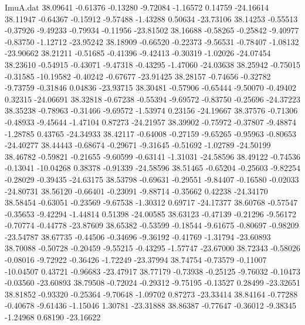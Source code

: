 \begin{filecontents}{ImuA.dat}
  38.09641   -0.61376   -0.13280   -9.72084   -1.16572    0.14759  -24.16614
  38.11947   -0.64367   -0.15912   -9.57488   -1.43288    0.50634  -23.73106
  38.14253   -0.55513   -0.37926   -9.49233   -0.79934   -0.11956  -23.81502
  38.16688   -0.58265   -0.25842   -9.40977   -0.83750   -1.12712  -23.95242
  38.18909   -0.66520   -0.22373   -9.56531   -0.78407   -1.08132  -23.90662
  38.21211   -0.51685   -0.41396   -9.42413   -0.30319   -1.02026  -24.07454
  38.23610   -0.54915   -0.43071   -9.47318   -0.43295   -1.47060  -24.03638
  38.25942   -0.75015   -0.31585  -10.19582   -0.40242   -0.67677  -23.91425
  38.28157   -0.74656   -0.32782   -9.73759   -0.31846    0.04836  -23.93715
  38.30481   -0.57906   -0.65444   -9.50070   -0.49402    0.32315  -24.06691
  38.32818   -0.67238   -0.55394   -9.69572   -0.83750   -0.25696  -24.37223
  38.35238   -0.78963   -0.31466   -9.69572   -1.53974    0.23156  -24.19667
  38.37576   -0.71306   -0.48933   -9.45644   -1.47104    0.87273  -24.21957
  38.39902   -0.75972   -0.37807   -9.48874   -1.28785    0.43765  -24.34933
  38.42117   -0.64008   -0.27159   -9.65265   -0.95963   -0.80653  -24.40277
  38.44443   -0.68674   -0.29671   -9.31645   -0.51692   -1.02789  -24.50199
  38.46782   -0.59821   -0.21655   -9.60599   -0.63141   -1.31031  -24.58596
  38.49122   -0.74536   -0.13041  -10.04268    0.38378   -0.91339  -24.58596
  38.51465   -0.65204   -0.25603   -9.82254   -0.28029   -0.39435  -24.63175
  38.53798   -0.69631   -0.29551   -9.84407   -0.16580   -0.02033  -24.80731
  38.56120   -0.66401   -0.23091   -9.88714   -0.35662    0.42238  -24.34170
  38.58454   -0.63051   -0.23569   -9.67538   -1.30312    0.69717  -24.17377
  38.60768   -0.57547   -0.35653   -9.42294   -1.44814    0.51398  -24.00585
  38.63123   -0.47139   -0.21296   -9.56172   -0.70774   -0.44778  -23.87609
  38.65382   -0.53599   -0.18544   -9.61675   -0.80697   -0.98209  -23.54787
  38.67735   -0.44506   -0.34696   -9.36192   -0.41769   -1.31794  -23.60893
  38.70088   -0.50728   -0.20459   -9.55215   -0.43295   -1.57747  -23.67000
  38.72343   -0.58026   -0.08016   -9.72922   -0.36426   -1.72249  -23.37994
  38.74754   -0.73579   -0.11007  -10.04507    0.43721   -0.96683  -23.47917
  38.77179   -0.73938   -0.25125   -9.76032   -0.10473   -0.03560  -23.60893
  38.79508   -0.72024   -0.29312   -9.75195   -0.13527    0.28499  -23.32651
  38.81852   -0.93320   -0.25364   -9.70648   -1.09702    0.87273  -23.33414
  38.84164   -0.77288   -0.40678   -9.61436   -1.15046    1.30781  -23.31888
  38.86387   -0.77647   -0.36012   -9.38345   -1.24968    0.68190  -23.16622

\end{filecontents}
